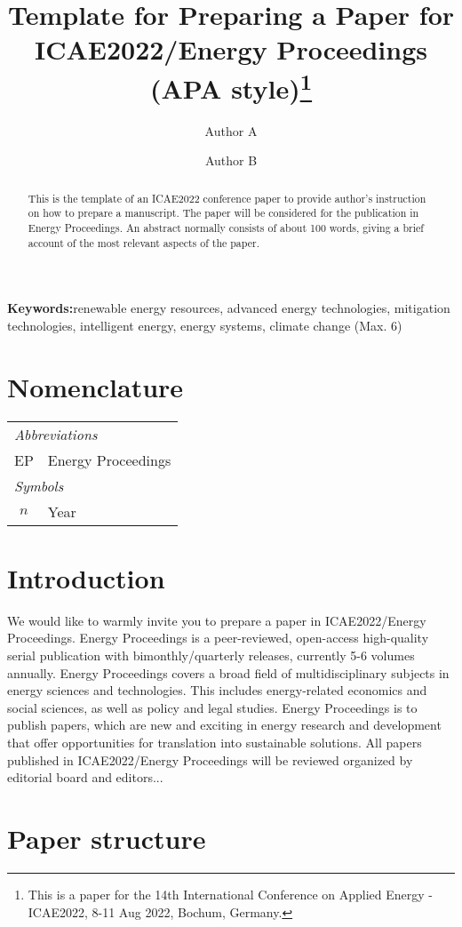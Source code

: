 \documentclass[11pt,a4paper,twoside,twocolumn]{article}
\title{\bfseries Template for Preparing a Paper for ICAE2022/Energy Proceedings (APA style)\footnote{This is a paper for the 14th International Conference on Applied Energy - ICAE2022, 8-11 Aug 2022, Bochum, Germany.}}
\author[1]{Author A}
\author[1,2,*]{Author B}
\affil[1]{Affiliation of author A}
\affil[2]{Affiliation of author B}
\affil[*]{Corresponding author.}
\date{}
\newcommand{\keywords}[1]{\noindent\textbf{Keywords:}\quad#1}
\begin{document}
\maketitle
\thispagestyle{fancy}

\begin{abstract}
    This is the template of an ICAE2022 conference paper to provide author’s instruction on how to prepare a manuscript. The paper will be considered for the publication in Energy Proceedings. An abstract normally consists of about 100 words, giving a brief account of the most relevant aspects of the paper.
\end{abstract}

\keywords{renewable energy resources, advanced energy technologies, mitigation technologies, intelligent energy, energy systems, climate change (Max. 6)}

\section*{Nomenclature}
\begin{tabularx}{\linewidth}{|cX|}
\hline
    \multicolumn{2}{|l|}{\itshape Abbreviations}\\
    EP & Energy Proceedings \\
    \multicolumn{2}{|l|}{\itshape Symbols}\\
    $n$ & Year  \\
\hline
\end{tabularx}

\section{Introduction}
We would like to warmly invite you to prepare a paper in ICAE2022/Energy Proceedings. Energy Proceedings is a peer-reviewed, open-access high-quality serial publication with bimonthly/quarterly releases, currently 5-6 volumes annually. Energy Proceedings covers a broad field of multidisciplinary subjects in energy sciences and 
technologies. This includes energy-related economics and social sciences, as well as policy and legal studies.
Energy Proceedings is to publish papers, which are new and exciting in energy research and development that offer opportunities for translation into sustainable solutions.
All papers published in ICAE2022/Energy Proceedings will be reviewed organized by editorial board and editors...

\section{Paper structure}
\end{document}
